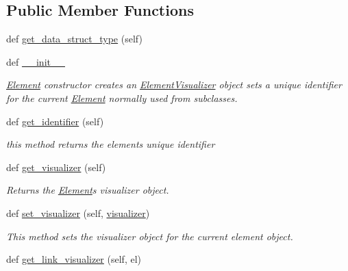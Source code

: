 \subsection*{Public Member Functions}
\begin{DoxyCompactItemize}
\item 
def \hyperlink{class_bridges_1_1_element_1_1_element_a3e2a72a74d5cab317aede86b226a4a49}{get\+\_\+data\+\_\+struct\+\_\+type} (self)
\item 
def \hyperlink{class_bridges_1_1_element_1_1_element_ae63373275370d08c1f75806a6ac990f1}{\+\_\+\+\_\+init\+\_\+\+\_\+}
\begin{DoxyCompactList}\small\item\em \hyperlink{class_bridges_1_1_element_1_1_element}{Element} constructor creates an \hyperlink{namespace_bridges_1_1_element_visualizer}{Element\+Visualizer} object sets a unique identifier for the current \hyperlink{class_bridges_1_1_element_1_1_element}{Element} normally used from subclasses. \end{DoxyCompactList}\item 
def \hyperlink{class_bridges_1_1_element_1_1_element_a84c0f69b4c630b9c25c12ec019e5caaa}{get\+\_\+identifier} (self)
\begin{DoxyCompactList}\small\item\em this method returns the element\textquotesingle{}s unique identifier \end{DoxyCompactList}\item 
def \hyperlink{class_bridges_1_1_element_1_1_element_a02945b22b48bf5517088a0db8b70fa94}{get\+\_\+visualizer} (self)
\begin{DoxyCompactList}\small\item\em Returns the \hyperlink{class_bridges_1_1_element_1_1_element}{Element}\textquotesingle{}s visualizer object. \end{DoxyCompactList}\item 
def \hyperlink{class_bridges_1_1_element_1_1_element_a43898806f4cc199664375bc690fea41e}{set\+\_\+visualizer} (self, \hyperlink{class_bridges_1_1_element_1_1_element_a754c5ca67518e3c9ff6b6e7882ed05c6}{visualizer})
\begin{DoxyCompactList}\small\item\em This method sets the visualizer object for the current element object. \end{DoxyCompactList}\item 
def \hyperlink{class_bridges_1_1_element_1_1_element_ac1627e47169e665776a0df1a886432f8}{get\+\_\+link\+\_\+visualizer} (self, el)

\end{DoxyCompactItemize}
